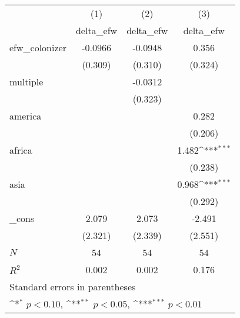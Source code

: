 {
\def\sym#1{\ifmmode^{#1}\else\(^{#1}\)\fi}
\begin{tabular}{l*{3}{c}}
\hline\hline
            &\multicolumn{1}{c}{(1)}&\multicolumn{1}{c}{(2)}&\multicolumn{1}{c}{(3)}\\
            &\multicolumn{1}{c}{delta\_efw}&\multicolumn{1}{c}{delta\_efw}&\multicolumn{1}{c}{delta\_efw}\\
\hline
efw\_colonizer&     -0.0966         &     -0.0948         &       0.356         \\
            &     (0.309)         &     (0.310)         &     (0.324)         \\
[1em]
multiple    &                     &     -0.0312         &                     \\
            &                     &     (0.323)         &                     \\
[1em]
america     &                     &                     &       0.282         \\
            &                     &                     &     (0.206)         \\
[1em]
africa      &                     &                     &       1.482\sym{***}\\
            &                     &                     &     (0.238)         \\
[1em]
asia        &                     &                     &       0.968\sym{***}\\
            &                     &                     &     (0.292)         \\
[1em]
\_cons      &       2.079         &       2.073         &      -2.491         \\
            &     (2.321)         &     (2.339)         &     (2.551)         \\
\hline
\(N\)       &          54         &          54         &          54         \\
\(R^{2}\)   &       0.002         &       0.002         &       0.176         \\
\hline\hline
\multicolumn{4}{l}{\footnotesize Standard errors in parentheses}\\
\multicolumn{4}{l}{\footnotesize \sym{*} \(p<0.10\), \sym{**} \(p<0.05\), \sym{***} \(p<0.01\)}\\
\end{tabular}
}
